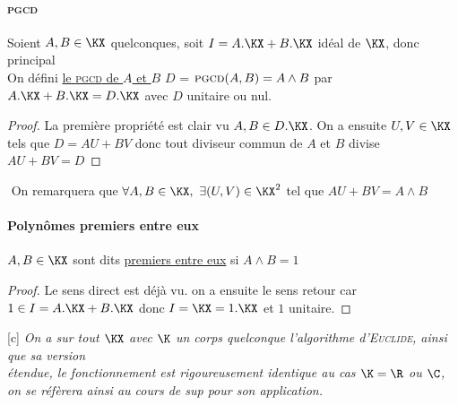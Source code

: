 		\paragraph{\textsc{pgcd}}
			Soient $A,B\in\KX$ quelconques, soit $I=A.\KX + B.\KX $ idéal de $\KX$, donc principal \\ 
			On défini \uline{le \textsc{pgcd} de $A$ et $B$} $D$ = $\textsc{pgcd}(A,B)=A\wedge B$ par \\
			\hspace*{2cm} $A.\KX + B.\KX = D.\KX$ avec $D$ unitaire ou nul. \trait
		\begin{proof}
		La première propriété est clair vu $A,B \in D.\KX$. On a ensuite $U,V \in \KX$ tels que $D=AU+BV$ donc tout diviseur commun de $A$ et $B$ divise $AU+BV=D$
		\end{proof} ${}$ 
		On remarquera que $\forall A,B\in\KX ,~ \exists (U,V)\in\KX^2$ tel que $AU+BV = A\wedge B$ \\
		\traitd
		\paragraph{Polynômes premiers entre eux}
			$A,B\in\KX$ sont dits \uline{premiers entre eux} si $A\wedge B=1$ \trait
		\begin{proof}
		Le sens direct est déjà vu. on a ensuite le sens retour car $1\in I=A.\KX + B.\KX$ donc $I=\KX = 1.\KX$ et $1$ unitaire.
		\end{proof}
		\begin{center}
		\begin{blockarray}{[c]}		
		\textit{On a sur tout $\KX$ avec $\K$ un corps quelconque l'algorithme d'\textsc{Euclide}, ainsi que sa version} \\ \textit{étendue, le fonctionnement est rigoureusement identique au cas $\K=\R$ ou $\C$,} \\ \textit{on se réfèrera ainsi au cours de sup pour son application.}
		\end{blockarray}
		\end{center}
		\traitd
